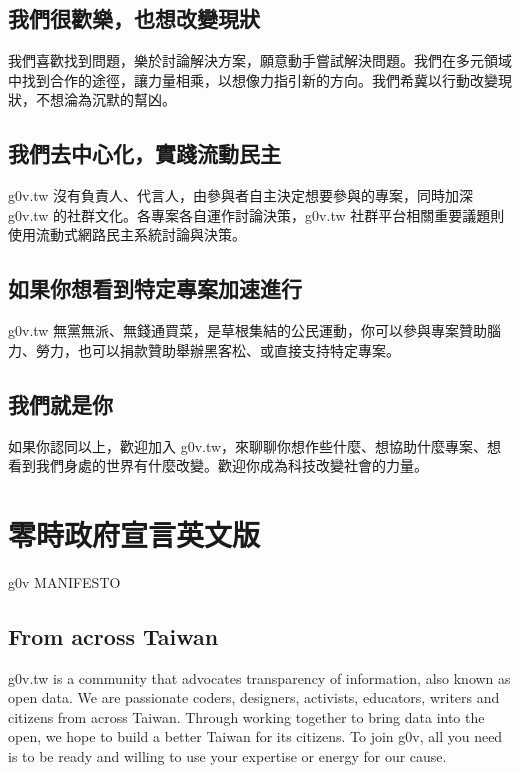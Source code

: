 \subsection{我們很歡樂，也想改變現狀}

我們喜歡找到問題，樂於討論解決方案，願意動手嘗試解決問題。我們在多元領域中找到合作的途徑，讓力量相乘，以想像力指引新的方向。我們希冀以行動改變現狀，不想淪為沉默的幫凶。

\subsection{我們去中心化，實踐流動民主}

g0v.tw 沒有負責人、代言人，由參與者自主決定想要參與的專案，同時加深 g0v.tw 的社群文化。各專案各自運作討論決策，g0v.tw 社群平台相關重要議題則使用流動式網路民主系統討論與決策。

\subsection{如果你想看到特定專案加速進行}

g0v.tw 無黨無派、無錢通買菜，是草根集結的公民運動，你可以參與專案贊助腦力、勞力，也可以捐款贊助舉辦黑客松、或直接支持特定專案。

\subsection{我們就是你}

如果你認同以上，歡迎加入 g0v.tw，來聊聊你想作些什麼、想協助什麼專案、想看到我們身處的世界有什麼改變。歡迎你成為科技改變社會的力量。

\section{零時政府宣言英文版}

g0v MANIFESTO 

\subsection{From across Taiwan}

g0v.tw is a community that advocates transparency of information, also known as open data. We are passionate coders, designers, activists, educators, writers and citizens from across Taiwan. Through working together to bring data into the open, we hope to build a better Taiwan for its citizens. To join g0v, all you need is to be ready and willing to use your expertise or energy for our cause.

